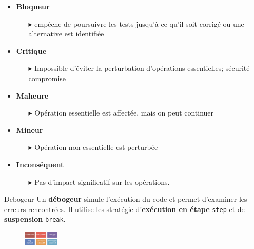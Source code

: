 \documentclass[16pt]{report}
\begin{document}
\begin{multicols*}{2}
        \begin{itemize}
            \item \textbf{Bloqueur}  
                \begin{itemize}
                    \item[$\blacktriangleright$]  empêche de poursuivre les tests jusqu’à ce qu’il soit corrigé ou 
                        une alternative est identifiée
                \end{itemize}
            \item \textbf{Critique}
                \begin{itemize}
                    \item[$\blacktriangleright$] Impossible d'éviter la perturbation d'opérations essentielles; 
                        sécurité compromise
                \end{itemize}
            \item \textbf{Maheure}
                \begin{itemize}
                    \item[$\blacktriangleright$] Opération essentielle est affectée, mais on peut continuer 
                \end{itemize}
            \item \textbf{Mineur}
                \begin{itemize}
                    \item[$\blacktriangleright$] Opération non-essentielle est perturbée
                \end{itemize}
            \item \textbf{Inconséquent}
                \begin{itemize}
                    \item[$\blacktriangleright$] Pas d'impact significatif sur les opérations. 
                \end{itemize}
        \end{itemize}

        \begin{Definitionx}{Debogeur}{}
            Un \textbf{débogeur} simule l'exécution du code et permet d'examiner les erreurs rencontrées. 
            Il utilise les stratégie d'\textbf{exécution en étape} \texttt{step} et de \textbf{suspension}
            \texttt{break}.   
        \end{Definitionx}


        \begin{figure}[H]
            \begin{center}
                \includegraphics[width=0.15\textwidth]{MethodesDebogage.png}
            \end{center}
        \end{figure}



\end{multicols*}
\end{document}
